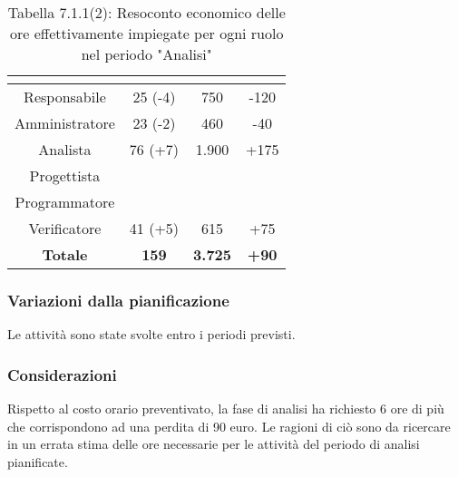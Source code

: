 \renewcommand{\arraystretch}{1.4}
\begin{table}[H]
\begin{center}
\begin{tabular}{|c|c|c|c|}
\hline
\rowcolor{title_row}
\textbf{\color{title_text}{Ruolo}}  & \textbf{\color{title_text}{Ore}} & \textbf{\color{title_text}{Costo in \euro}} & \textbf{\color{title_text}{Differenza al preventivo in \euro}} \\ \hline
Responsabile    & 25 (-4) & 750 & -120 \\ \hline
Amministratore  & 23 (-2) & 460 & -40 \\ \hline
Analista        & 76 (+7) & 1.900 & +175 \\ \hline
Progettista     & & &  \\ \hline
Programmatore   & & &  \\ \hline
Verificatore    & 41 (+5) & 615 & +75  \\ \hline
\textbf{Totale} & \textbf{159}    & \textbf{3.725} & \textbf{+90} \\ \hline
\end{tabular}
\caption{Tabella 7.1.1(2): Resoconto economico delle ore effettivamente impiegate per ogni ruolo nel periodo "Analisi"\label{}}
\end{center}
\end{table}
\renewcommand{\arraystretch}{1}


\subsubsection{Variazioni dalla pianificazione}
Le attività sono state svolte entro i periodi previsti.

\subsubsection{Considerazioni}
Rispetto al costo orario preventivato, la fase di analisi ha richiesto 6 
ore di più che corrispondono ad una perdita di 90 euro. Le ragioni di ciò sono
da ricercare in un errata stima delle ore necessarie per le attività del periodo di analisi pianificate.

\pagebreak
